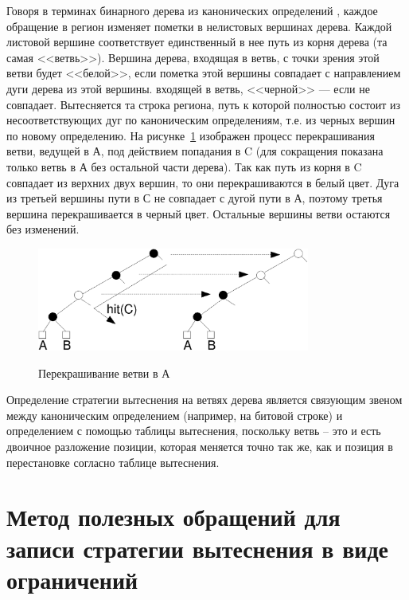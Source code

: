 \begin{enumerate}
Говоря в терминах бинарного дерева из канонических определений \PseudoLRU, каждое обращение в регион изменяет пометки в нелистовых вершинах дерева. Каждой листовой вершине соответствует единственный в нее путь из корня дерева (та самая <<ветвь>>). Вершина дерева, входящая в ветвь, с точки зрения этой ветви будет <<белой>>, если пометка этой вершины совпадает с направлением дуги дерева из этой вершины. входящей в ветвь, <<черной>> --- если не совпадает. Вытесняется та строка региона, путь к которой полностью состоит из несоответствующих дуг по каноническим определениям, т.е. из черных вершин по новому определению. На рисунке~\ref{recolor}
изображен процесс перекрашивания ветви, ведущей в А, под действием
попадания в C (для сокращения показана только ветвь в А без
остальной части дерева). Так как путь из корня в C совпадает из
верхних двух вершин, то они перекрашиваются в белый цвет. Дуга из
третьей вершины пути в С не совпадает с дугой пути в А, поэтому
третья вершина перекрашивается в черный цвет. Остальные вершины
ветви остаются без изменений.

\begin{figure}[h] \center
  \includegraphics[width=0.8\textwidth]{1.review/recolor}\\
  \caption{Перекрашивание ветви в А}\label{recolor}
\end{figure}


Определение стратегии вытеснения \PseudoLRU на ветвях дерева
является связующим звеном между каноническим определением (например,
на битовой строке) и определением с помощью таблицы вытеснения,
поскольку ветвь -- это и есть двоичное разложение позиции, которая меняется точно так же, как и позиция в перестановке согласно таблице вытеснения.



\section{Метод полезных обращений для записи стратегии вытеснения в виде ограничений}\label{sec:usefulness_functions}


\end{enumerate}

